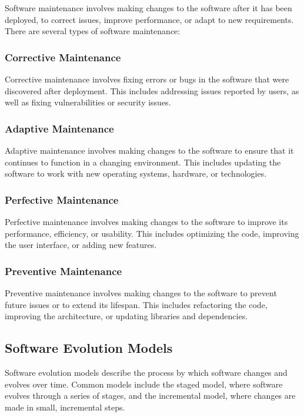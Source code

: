 \begin{refsection}
\begin{multicols}{2}
{Software maintenance involves making changes to the software after it has been deployed, to correct issues, improve performance, or adapt to new requirements. There are several types of software maintenance:

\subsubsection{Corrective Maintenance}

Corrective maintenance involves fixing errors or bugs in the software that were discovered after deployment. This includes addressing issues reported by users, as well as fixing vulnerabilities or security issues.

\subsubsection{Adaptive Maintenance}

Adaptive maintenance involves making changes to the software to ensure that it continues to function in a changing environment. This includes updating the software to work with new operating systems, hardware, or technologies.

\subsubsection{Perfective Maintenance}

Perfective maintenance involves making changes to the software to improve its performance, efficiency, or usability. This includes optimizing the code, improving the user interface, or adding new features.

\subsubsection{Preventive Maintenance}

Preventive maintenance involves making changes to the software to prevent future issues or to extend its lifespan. This includes refactoring the code, improving the architecture, or updating libraries and dependencies.

\subsection{Software Evolution Models}

Software evolution models describe the process by which software changes and evolves over time. Common models include the staged model, where software evolves through a series of stages, and the incremental model, where changes are made in small, incremental steps.

}
\end{multicols}
\end{refsection}
